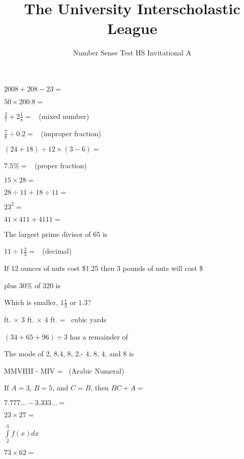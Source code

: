 \documentclass{numbersense}
\title{The University Interscholastic League}
\subtitle{Number Sense Test \bigdot HS Invitational A \bigdot 2008}
\begin{document}
\begin{questions}

    \q $2008 + 208 - 23 = $ \hrulefill

    \q $50 \times 200.8 = $ \hrulefill

    \q $\frac{2}{7} + 2 \frac{1}{8} = $ \hrulefill~(mixed number)

    \q $\frac{7}{8} \div 0.2 = $ \hrulefill~(improper fraction)

    \q $(24 + 18) \div 12 \times (3-6) =$ \hrulefill

    \q $7.5\% = $ \hrulefill~(proper fraction)

    \q $15 \times 28 = $ \hrulefill

    \q $28 \div 11 + 18 \div 11 = $ \hrulefill

    \q $23^2 =$ \hrulefill

    \q $41 \times 411 + 4111=$ \hrulefill

    \q The largest prime divisor of 65 is \hrulefill

    \q $11 \div 1\frac{2}{3}=$ \hrulefill~(decimal)

    \q If 12 ounces of nuts cost \$1.25 then 3 pounds of nuts will
      cost \$\hrulefill

     plus 30\% of 320 is \hrulefill

    \q Which is smaller, $1\frac{1}{3}$ or $1.3$? \hrulefill

     ft. $ \times $ 3 ft. $\times$ 4 ft. =
      \hrulefill~cubic yards

    \q $(34 + 65 + 96) \div 3$ has a remainder of \hrulefill

    \q The mode of 2, 8,4, 8, 2,- 4, 8, 4, and 8 is \hrulefill

    \q MMVIIII - MIV = \hrulefill~(Arabic Numeral)

    \q%

    \q If $A = 3$, $B=5$, and $C = B$, then $BC + A = $ \hrulefill

    \q $7.777\ldots - 3.333\ldots = $ \hrulefill

      \q $ 23 \times 27 = $ \hrulefill

      \q $\int\limits_{2}^{3} f(x) dx$

      \q $73 \times 62 =$ \hrulefill




\end{questions}
\end{document}
